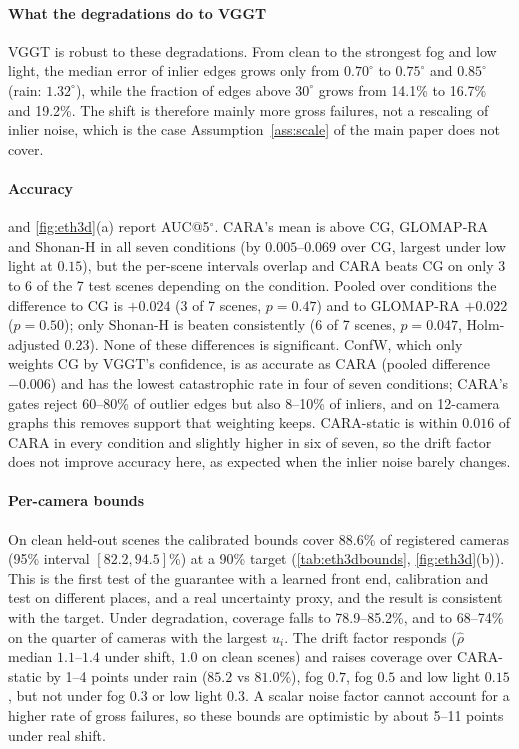 

\paragraph{What the degradations do to VGGT} VGGT is robust to these degradations. From clean to the strongest fog and low light, the median error of inlier edges grows only from $0.70^\circ$ to $0.75^\circ$ and $0.85^\circ$ (rain: $1.32^\circ$), while the fraction of edges above $30^\circ$ grows from 14.1\% to 16.7\% and 19.2\%. The shift is therefore mainly more gross failures, not a rescaling of inlier noise, which is the case Assumption~\ref{ass:scale} of the main paper does not cover.

\paragraph{Accuracy}  and \cref{fig:eth3d}(a) report AUC@5$^\circ$. CARA's mean is above CG, GLOMAP-RA and Shonan-H in all seven conditions (by $0.005$--$0.069$ over CG, largest under low light at $0.15$), but the per-scene intervals overlap and CARA beats CG on only 3 to 6 of the 7 test scenes depending on the condition. Pooled over conditions the difference to CG is $+0.024$ (3 of 7 scenes, $p=0.47$) and to GLOMAP-RA $+0.022$ ($p=0.50$); only Shonan-H is beaten consistently (6 of 7 scenes, $p=0.047$, Holm-adjusted $0.23$). None of these differences is significant. ConfW, which only weights CG by VGGT's confidence, is as accurate as CARA (pooled difference $-0.006$) and has the lowest catastrophic rate in four of seven conditions; CARA's gates reject 60--80\% of outlier edges but also 8--10\% of inliers, and on 12-camera graphs this removes support that weighting keeps. CARA-static is within $0.016$ of CARA in every condition and slightly higher in six of seven, so the drift factor does not improve accuracy here, as expected when the inlier noise barely changes.



\paragraph{Per-camera bounds} On clean held-out scenes the calibrated bounds cover 88.6\% of registered cameras (95\% interval $[82.2,94.5]$\%) at a 90\% target (\cref{tab:eth3dbounds}, \cref{fig:eth3d}(b)). This is the first test of the guarantee with a learned front end, calibration and test on different places, and a real uncertainty proxy, and the result is consistent with the target. Under degradation, coverage falls to 78.9--85.2\%, and to 68--74\% on the quarter of cameras with the largest $u_i$. The drift factor responds ($\hat\rho$ median $1.1$--$1.4$ under shift, $1.0$ on clean scenes) and raises coverage over CARA-static by 1--4 points under rain ($85.2$ vs $81.0$\%), fog $0.7$, fog $0.5$ and low light $0.15$, but not under fog $0.3$ or low light $0.3$. A scalar noise factor cannot account for a higher rate of gross failures, so these bounds are optimistic by about 5--11 points under real shift.

